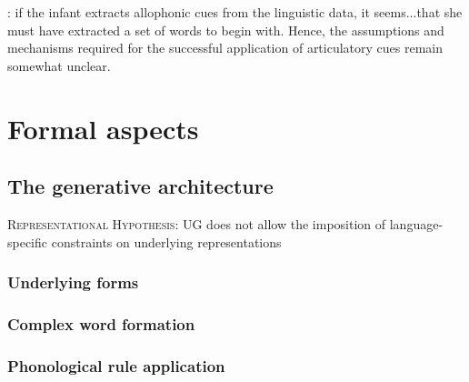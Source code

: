 \citet{Mattys2001a,Mattys2001b}

\citet{Onishi2002,Chambers2003}

\citet{Adriaans2010}

\citet{Yang2004,Gambell2005,Lignos2010,Lignos2011}

\citet{Jusczyk1999c}
\citet{Johnson2001}

\citet{Gambell2005}:
if the infant extracts allophonic cues from the linguistic data, it seems...that she must have extracted a set of words to begin with. Hence, the assumptions and mechanisms required for the successful application of articulatory cues remain somewhat unclear.


\section{Formal aspects}

\subsection{The generative architecture}

\ex \textsc{Representational Hypothesis}: UG does not allow the imposition of language-specific constraints on underlying representations \xe

\subsubsection{Underlying forms}

\subsubsection{Complex word formation}

\subsubsection{Phonological rule application}

